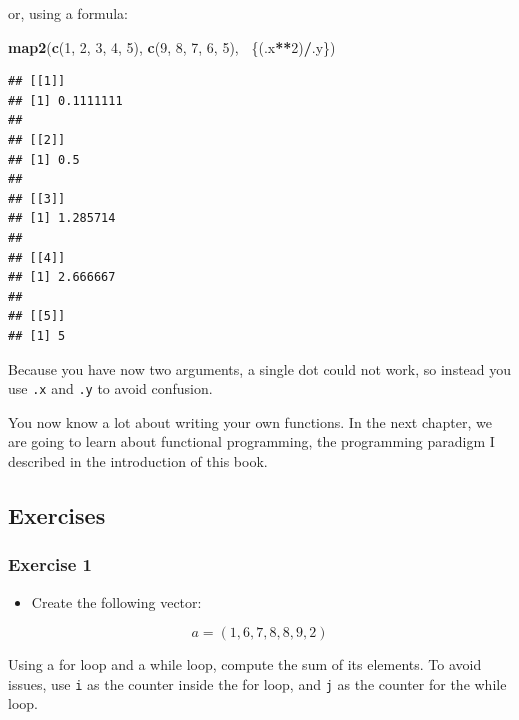 \documentclass[]{gitbook}
\newenvironment{Shaded}{\begin{snugshade}}{\end{snugshade}}
\newcommand{\DecValTok}[1]{\textcolor[rgb]{0.00,0.00,0.81}{#1}}
\newcommand{\KeywordTok}[1]{\textcolor[rgb]{0.13,0.29,0.53}{\textbf{#1}}}
\newcommand{\NormalTok}[1]{#1}
\newcommand{\OperatorTok}[1]{\textcolor[rgb]{0.81,0.36,0.00}{\textbf{#1}}}
\providecommand{\tightlist}{%
  \setlength{\itemsep}{0pt}\setlength{\parskip}{0pt}}
\begin{document}
or, using a formula:

\begin{Shaded}
\begin{Highlighting}[]
\KeywordTok{map2}\NormalTok{(}\KeywordTok{c}\NormalTok{(}\DecValTok{1}\NormalTok{, }\DecValTok{2}\NormalTok{, }\DecValTok{3}\NormalTok{, }\DecValTok{4}\NormalTok{, }\DecValTok{5}\NormalTok{), }\KeywordTok{c}\NormalTok{(}\DecValTok{9}\NormalTok{, }\DecValTok{8}\NormalTok{, }\DecValTok{7}\NormalTok{, }\DecValTok{6}\NormalTok{, }\DecValTok{5}\NormalTok{), }\OperatorTok{~}\NormalTok{\{(.x}\OperatorTok{**}\DecValTok{2}\NormalTok{)}\OperatorTok{/}\NormalTok{.y\})}
\end{Highlighting}
\end{Shaded}

\begin{verbatim}
## [[1]]
## [1] 0.1111111
## 
## [[2]]
## [1] 0.5
## 
## [[3]]
## [1] 1.285714
## 
## [[4]]
## [1] 2.666667
## 
## [[5]]
## [1] 5
\end{verbatim}

Because you have now two arguments, a single dot could not work, so instead you use \texttt{.x} and \texttt{.y} to
avoid confusion.

You now know a lot about writing your own functions. In the next chapter, we are going to learn about
functional programming, the programming paradigm I described in the introduction of this book.

\hypertarget{exercises-5}{%
\subsection{Exercises}\label{exercises-5}}

\hypertarget{exercise-1-5}{%
\subsubsection*{Exercise 1}\label{exercise-1-5}}

\begin{itemize}
\tightlist
\item
  Create the following vector:
\end{itemize}

\[a = (1,6,7,8,8,9,2)\]

Using a for loop and a while loop, compute the sum of its elements. To avoid issues, use \texttt{i}
as the counter inside the for loop, and \texttt{j} as the counter for the while loop.
\end{document}
